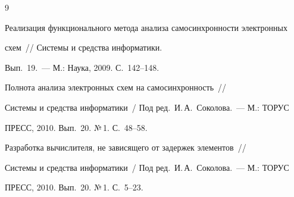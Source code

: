 {{\begin{thebibliography}{9}




Реализация функционального метода анализа самосинхронности электронных 


схем~/\!\!/ Системы и средства информатики. 


Вып.~19.~--- М.: Наука, 2009.  С.~142--148.









Полнота анализа электронных схем на самосинхронность~/\!\!/ 


Системы и средства информатики~/ Под ред.\ И.\,А.~Соколова.~--- М.: ТОРУС 


ПРЕСС, 2010.   Вып.~20.  №\,1. С.~48--58.





 \label{end\stat}









Разработка вычислителя, не зависящего от задержек элементов~/\!\!/  


Системы и средства информатики~/ Под ред.\ И.\,А.~Соколова.~--- М.: ТОРУС 


ПРЕСС, 2010.    Вып.~20. №\,1. С.~5--23.


 \end{thebibliography}


}


}


